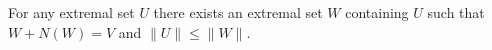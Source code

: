 For any extremal set $U$ there exists an extremal set $W$ containing $U$ such that $W + N(W) = V$ and $\|U\| \leq \|W\|$.
